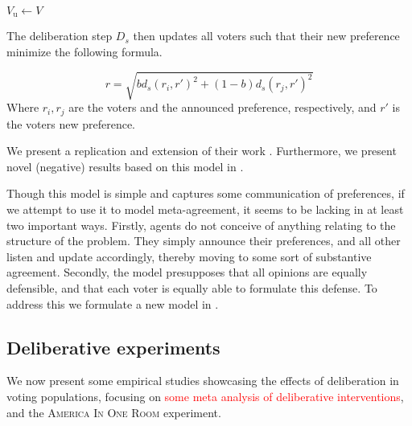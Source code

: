 \IncMargin{1em}
\begin{algorithm}

	\BlankLine

	$V_{\text{u}} \gets V$ \\

\end{algorithm}
\DecMargin{1em}

The deliberation step $D_s$ then updates all voters such that their new
preference  minimize the following formula.

\begin{equation}
	r =
	\sqrt{
		b d_s(r_i, r')^2 + (1-b)d_s(r_j, r')^2
	}
	\label{eq:deliberation_step_formula}
\end{equation}
Where $r_i, r_j$ are the voters and the announced preference, respectively, and
$r'$ is the voters new preference.

We present a replication and extension of their work .
Furthermore, we present novel (negative) results based on this model in
.

Though this model is simple and captures some communication of preferences, if
we attempt to use it to model meta-agreement, it seems to be lacking in at
least two important ways. Firstly, agents do not conceive of anything relating
to the structure of the problem. They simply announce their preferences, and
all other listen and update accordingly, thereby moving to some sort of
substantive agreement. Secondly, the model presupposes that all opinions are
equally defensible, and that each voter is equally able to formulate this
defense. To address this we formulate a new model in .


\subsection{Deliberative experiments}

We now present some empirical studies showcasing the effects of deliberation in
voting populations, focusing on \textcolor{red}{some meta analysis of
	deliberative interventions}, and the \textsc{America In One Room} experiment.

